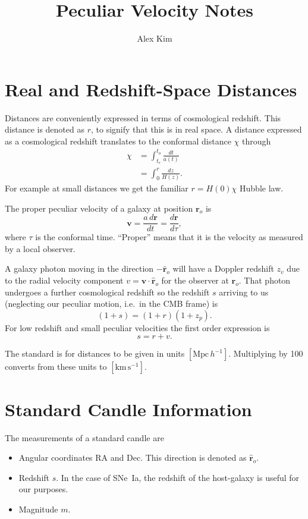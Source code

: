 \documentclass[11pt, oneside]{article}   	%
\title{Peculiar Velocity Notes}
\author{Alex Kim}
\begin{document}
\maketitle


\section{Real and Redshift-Space Distances}
\label{distances:sec}
Distances  are conveniently expressed
in terms of cosmological redshift.
This distance is denoted as $r$, to signify that this is in real space.
A distance expressed as a cosmological redshift  translates to the conformal distance $\chi$
through
\begin{align}
\chi & = \int_{t_e}^{t_o} \frac{dt}{a(t)} \\
&= \int_{0}^{r} \frac{dz}{H(z)}.
\end{align}
For example at small distances we get the familiar $r=H(0) \chi$ Hubble law.

The proper peculiar velocity of a galaxy at position $\mathbf{r}_o$ is
\begin{equation}
\mathbf{v} = \frac{a\,d\mathbf{r}}{dt}= \frac{d\mathbf{r}}{d\tau},
\end{equation}
where $\tau$ is the conformal time.  ``Proper'' means that it is the velocity as
measured by a local observer.

A galaxy photon moving in the direction $-\mathbf{\hat{r}}_o$ will have
a   Doppler redshift $z_v$ due to the radial
velocity component $v=\mathbf{v} \cdot  \mathbf{\hat{r}}_o$ for the observer at $\mathbf{r}_o$.
That photon undergoes a further cosmological redshift so the redshift $s$
arriving to us (neglecting our peculiar motion, i.e.\ in the CMB frame) is 
\begin{equation}
(1+s)  = (1+r)(1+z_p).
\end{equation}
For low redshift and small peculiar velocities the first order expression is
\begin{equation}
s  = r +v.
\end{equation}

The standard is for distances to be given in units $[\text{Mpc}\,h^{-1}]$.  Multiplying
by 100 converts from these units  to $[\text{km}\,\text{s}^{-1}]$.


\section{Standard Candle Information}
The measurements of a standard candle are
\begin{itemize}
\item Angular coordinates RA and Dec.  This direction is denoted as $\mathbf{\hat{r}}_o$.
\item Redshift $s$. In the case of SNe~Ia, the redshift of the host-galaxy is useful for our purposes.
\item Magnitude $m$.
\end{itemize}
\end{document}

